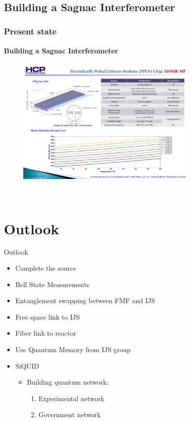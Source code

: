 \documentclass[serif,8pt]{beamer}
\begin{document}
\subsection{Building a Sagnac Interferometer}
\begin{frame}[t]
	\frametitle{Present state}
	\framesubtitle{Building a Sagnac Interferometer}
	  \pause
	\begin{figure}[!ht]
	  \centering
	  \includegraphics[width=9cm]{Type0Gratings.pdf}
	  \caption{\textcolor{white}{Specifications from the crystal manufacturer.\\\textit{Source: HC Photonics Corp.}}}
	\end{figure}
\end{frame}
\usebackgroundtemplate{}


\section{Outlook}
\begin{frame}{Outlook}
	\begin{itemize}
		\item Complete the source
		\item Bell State Measurements %
		\item Entanglement swapping between FMF and IJS
		\item Free space link to IJS
		\item Fiber link to reactor
		\item Use Quantum Memory from IJS group
		\item SiQUID
			\begin{itemize}
				\item Building quantum network:
					\begin{enumerate}
						\item Experimental network
						\item Government network 
					\end{enumerate}
			\end{itemize}
	\end{itemize}
\end{frame}
\end{document}
